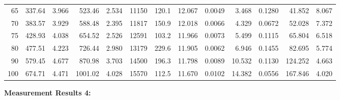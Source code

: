 \documentclass[10pt]{article}
\begin{document}
{\begin{tabular}{|r|rr|rr|rr|rr|rr|r|r|}
       65 &       337.64 &        3.966 &       523.46 &        2.534 &        11150 &        120.1 &       12.067 &       0.0049 &        3.468 &       0.1280 &       41.852 &        8.067 \\
       70 &       383.57 &        3.929 &       588.48 &        2.395 &        11817 &        150.9 &       12.018 &       0.0066 &        4.329 &       0.0672 &       52.028 &        7.372 \\
       75 &       428.93 &        4.038 &       654.52 &        2.526 &        12591 &        103.2 &       11.966 &       0.0073 &        5.499 &       0.1115 &       65.804 &        6.518 \\
       80 &       477.51 &        4.223 &       726.44 &        2.980 &        13179 &        229.6 &       11.905 &       0.0062 &        6.946 &       0.1455 &       82.695 &        5.774 \\
       90 &       579.45 &        4.677 &       870.98 &        3.703 &        14500 &        196.3 &       11.798 &       0.0089 &       10.532 &       0.1130 &      124.252 &        4.663 \\
      100 &       674.71 &        4.471 &      1001.02 &        4.028 &        15570 &        112.5 &       11.670 &       0.0102 &       14.382 &       0.0556 &      167.846 &        4.020 \\
\hline
\end{tabular}
}

\vspace{3mm}

\noindent
{\large \bf Measurement Results 4:}
\vspace{3mm}
\end{document}
